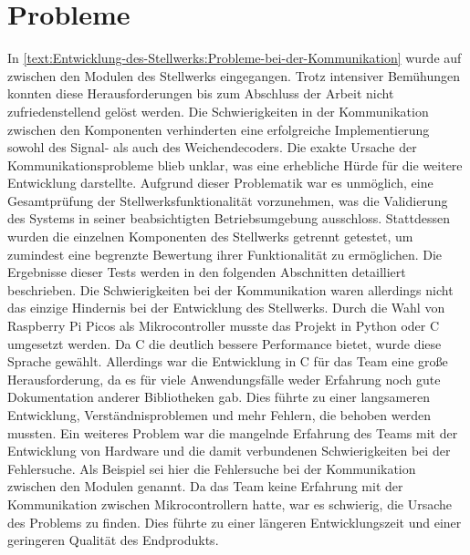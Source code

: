 \section{Probleme}\label{text:Auswertung:Probleme}

In \autoref{text:Entwicklung-des-Stellwerks:Probleme-bei-der-Kommunikation} wurde auf  zwischen den Modulen des Stellwerks eingegangen. Trotz intensiver Bemühungen konnten diese Herausforderungen bis zum Abschluss der Arbeit nicht zufriedenstellend gelöst werden. Die Schwierigkeiten in der Kommunikation zwischen den Komponenten verhinderten eine erfolgreiche Implementierung sowohl des Signal- als auch des Weichendecoders.
Die exakte Ursache der Kommunikationsprobleme blieb unklar, was eine erhebliche Hürde für die weitere Entwicklung darstellte. Aufgrund dieser Problematik war es unmöglich, eine Gesamtprüfung der Stellwerksfunktionalität vorzunehmen, was die Validierung des Systems in seiner beabsichtigten Betriebsumgebung ausschloss. Stattdessen wurden die einzelnen Komponenten des Stellwerks getrennt getestet, um zumindest eine begrenzte Bewertung ihrer Funktionalität zu ermöglichen. Die Ergebnisse dieser Tests werden in den folgenden Abschnitten detailliert beschrieben.
\newline
Die Schwierigkeiten bei der Kommunikation waren allerdings nicht das einzige Hindernis bei der Entwicklung des Stellwerks. Durch die Wahl von Raspberry Pi Picos als Mikrocontroller musste das Projekt in Python oder C umgesetzt werden. Da C die deutlich bessere Performance bietet, wurde diese Sprache gewählt. Allerdings war die Entwicklung in C für das Team eine große Herausforderung, da es für viele Anwendungsfälle weder Erfahrung noch gute Dokumentation anderer Bibliotheken gab.
Dies führte zu einer langsameren Entwicklung, Verständnisproblemen und mehr Fehlern, die behoben werden mussten. Ein weiteres Problem war die mangelnde Erfahrung des Teams mit der Entwicklung von Hardware und die damit verbundenen Schwierigkeiten bei der Fehlersuche. Als Beispiel sei hier die Fehlersuche bei der Kommunikation zwischen den Modulen genannt. Da das Team keine Erfahrung mit der Kommunikation zwischen Mikrocontrollern hatte, war es schwierig, die Ursache des Problems zu finden. Dies führte zu einer längeren Entwicklungszeit und einer geringeren Qualität des Endprodukts.
